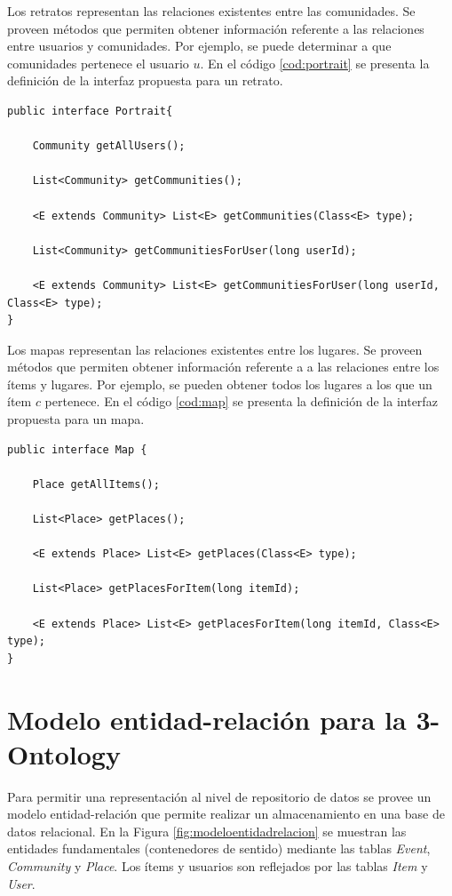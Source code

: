 Los retratos representan las relaciones existentes entre las comunidades. Se proveen métodos que permiten obtener información referente a las relaciones entre usuarios y comunidades. Por ejemplo, se puede determinar a que comunidades pertenece el usuario $u$. En el código \ref{cod:portrait} se presenta la definición de la interfaz propuesta para un retrato.

\begin{lstlisting}[float,caption = Interfaz Portrait, label = cod:portrait]
public interface Portrait{
    
    Community getAllUsers();
    
    List<Community> getCommunities();

    <E extends Community> List<E> getCommunities(Class<E> type);

    List<Community> getCommunitiesForUser(long userId);

    <E extends Community> List<E> getCommunitiesForUser(long userId, Class<E> type);  
}
\end{lstlisting}

Los mapas representan las relaciones existentes entre los lugares. Se proveen métodos que permiten obtener información referente a a las relaciones entre los ítems y lugares. Por ejemplo, se pueden obtener todos los lugares a los que un ítem $c$ pertenece. En el código \ref{cod:map} se presenta la definición de la interfaz propuesta para un mapa.

\begin{lstlisting}[float, caption = Interfaz Mapa, label = cod:map]
public interface Map {  
  
    Place getAllItems();
    
    List<Place> getPlaces();
    
    <E extends Place> List<E> getPlaces(Class<E> type);
    
    List<Place> getPlacesForItem(long itemId);

    <E extends Place> List<E> getPlacesForItem(long itemId, Class<E> type);  
}
\end{lstlisting}

\section{Modelo entidad-relación para la 3-Ontology}

Para permitir una representación al nivel de repositorio de datos se provee un modelo entidad-relación que permite realizar un almacenamiento en una base de datos
relacional. En la Figura \ref{fig:modeloentidadrelacion} se muestran las entidades fundamentales (contenedores de sentido) mediante las tablas \textit{Event}, \textit{Community} y \textit{Place}. Los ítems y usuarios son reflejados por las tablas \textit{Item} y \textit{User}.

